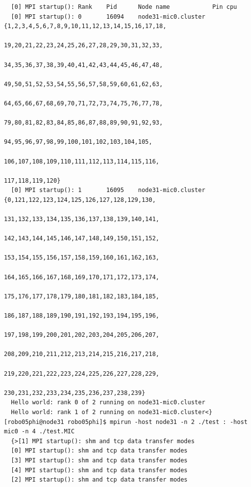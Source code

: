 \documentclass[pscyr,10pt]{hedlab}
\begin{document}
\begin{lstlisting}
  [0] MPI startup(): Rank    Pid      Node name            Pin cpu
  [0] MPI startup(): 0       16094    node31-mic0.cluster  {1,2,3,4,5,6,7,8,9,10,11,12,13,14,15,16,17,18,
                                                            19,20,21,22,23,24,25,26,27,28,29,30,31,32,33,
                                                            34,35,36,37,38,39,40,41,42,43,44,45,46,47,48,
                                                            49,50,51,52,53,54,55,56,57,58,59,60,61,62,63,
                                                            64,65,66,67,68,69,70,71,72,73,74,75,76,77,78,
                                                            79,80,81,82,83,84,85,86,87,88,89,90,91,92,93,
                                                            94,95,96,97,98,99,100,101,102,103,104,105,
                                                            106,107,108,109,110,111,112,113,114,115,116,
                                                            117,118,119,120}
  [0] MPI startup(): 1       16095    node31-mic0.cluster  {0,121,122,123,124,125,126,127,128,129,130,
                                                            131,132,133,134,135,136,137,138,139,140,141,
                                                            142,143,144,145,146,147,148,149,150,151,152,
                                                            153,154,155,156,157,158,159,160,161,162,163,
                                                            164,165,166,167,168,169,170,171,172,173,174,
                                                            175,176,177,178,179,180,181,182,183,184,185,
                                                            186,187,188,189,190,191,192,193,194,195,196,
                                                            197,198,199,200,201,202,203,204,205,206,207,
                                                            208,209,210,211,212,213,214,215,216,217,218,
                                                            219,220,221,222,223,224,225,226,227,228,229,
                                                            230,231,232,233,234,235,236,237,238,239}
  Hello world: rank 0 of 2 running on node31-mic0.cluster
  Hello world: rank 1 of 2 running on node31-mic0.cluster<}
[robo05phi@node31 robo05phi]$ mpirun -host node31 -n 2 ./test : -host mic0 -n 4 ./test.MIC
  {>[1] MPI startup(): shm and tcp data transfer modes
  [0] MPI startup(): shm and tcp data transfer modes
  [3] MPI startup(): shm and tcp data transfer modes
  [4] MPI startup(): shm and tcp data transfer modes
  [2] MPI startup(): shm and tcp data transfer modes

\end{lstlisting}
\end{document}
